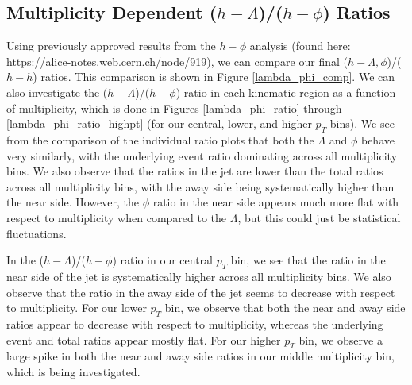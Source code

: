 \documentclass[ALICE,manyauthors]{ALICE_analysis_notes}
\begin{document}
\subsection{Multiplicity Dependent ($h-\Lambda$)/($h-\phi$) Ratios}
Using previously approved results from the $h-\phi$ analysis (found here: https://alice-notes.web.cern.ch/node/919), we can compare our final ($h-\Lambda, \phi$)/($h-h$) ratios. This comparison is shown in Figure \ref{lambda_phi_comp}. We can also investigate the ($h-\Lambda$)/($h-\phi$) ratio in each kinematic region as a function of multiplicity, which is done in Figures \ref{lambda_phi_ratio} through \ref{lambda_phi_ratio_highpt} (for our central, lower, and higher $p_{T}$ bins). We see from the comparison of the individual ratio plots that both the $\Lambda$ and $\phi$ behave very similarly, with the underlying event ratio dominating across all multiplicity bins. We also observe that the ratios in the jet are lower than the total ratios across all multiplicity bins, with the away side being systematically higher than the near side. However, the $\phi$ ratio in the near side appears much more flat with respect to multiplicity when compared to the $\Lambda$, but this could just be statistical fluctuations.

In the ($h-\Lambda$)/($h-\phi$) ratio in our central $p_{T}$ bin, we see that the ratio in the near side of the jet is systematically higher across all multiplicity bins. We also observe that the ratio in the away side of the jet seems to decrease with respect to multiplicity. For our lower $p_{T}$ bin, we observe that both the near and away side ratios appear to decrease with respect to multiplicity, whereas the underlying event and total ratios appear mostly flat. For our higher $p_{T}$ bin, we observe a large spike in both the near and away side ratios in our middle multiplicity bin, which is being investigated.
\end{document}
